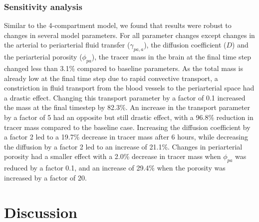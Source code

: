 \documentclass[a4paper,11pt]{article}
\newcommand{\AP}[1]{\textcolor{blue}{AP: #1}}
\newcommand{\1}{^{(1)}}
\newcommand{\2}{^{(2)}}
\begin{document}
\subsubsection{Sensitivity analysis}
Similar to the 4-compartment model, we found that results were robust to changes in several model parameters. For all parameter changes except changes in the arterial to periarterial fluid transfer ($\gamma_{pa,a}$), the diffusion coefficient ($D$) and the periarterial porosity ($\phi_{pa}$), the tracer mass in the brain at the final time step changed less than 3.1\% compared to baseline parameters. As the total mass is already low at the final time step due to rapid convective transport, a constriction in fluid transport from the blood vessels to the periarterial space had a drastic effect. Changing this transport parameter by a factor of 0.1 increased the mass at the final timestep by 82.3\%. An increase in the transport parameter by a factor of 5 had an opposite but still drastic effect, with a 96.8\% reduction in tracer mass compared to the baseline case. Increasing the diffusion coefficient by a factor 2 led to a 19.7\% decrease in tracer mass after 6 hours, while decreasing the diffusion by a factor 2 led to an increase of 21.1\%. Changes in periarterial porosity had a smaller effect with a 2.0\% decrease in tracer mass when $\phi_{pa}$ was reduced by a factor 0.1, and an increase of 29.4\% when the porosity was increased by a factor of 20. 


\section{Discussion}
\label{sec:discussion}

\end{document}
